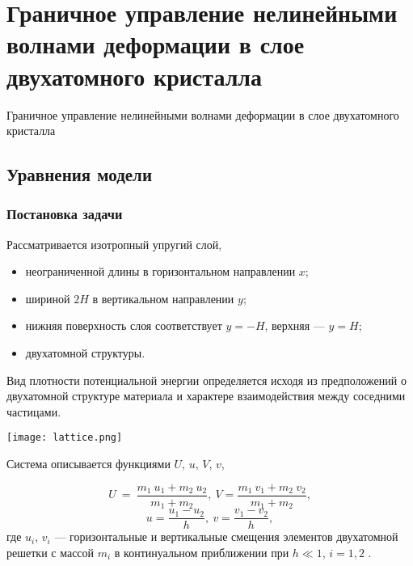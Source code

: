 \section{Граничное управление нелинейными волнами деформации в слое двухатомного кристалла}
\begin{frame}
    \begin{center}
        \Large
        Граничное управление нелинейными волнами деформации в слое двухатомного кристалла
    \end{center}
\end{frame}

\subsection{Уравнения модели}

\begin{frame}
	\frametitle{Постановка задачи}
Рассматривается изотропный упругий слой,
\begin{itemize}
	\item неограниченной длины в горизонтальном направлении $x$;
	\item шириной $2 H$ в вертикальном направлении $y$;
	\item нижняя поверхность слоя соответствует $y = -H$, верхняя --- $y = H$;
	\item двухатомной структуры.
\end{itemize}   

Вид плотности потенциальной энергии определяется исходя из предположений о двухатомной структуре материала и характере взаимодействия между соседними частицами.

\end{frame}

\begin{frame}
	\begin{center}
		\texttt{[image: lattice.png]}
	\end{center}
	Система описывается функциями $U$, $u$, $V$, $v$,
	
	$$
	U~=~\frac{m_1~u_1+m_2~u_2}{m_1+m_2},~V=\frac{m_1~v_1+m_2~v_2}{m_1+m_2},
	$$
	$$
	u=\frac{u_1-u_2}{h},~v=\frac{v_1-v_2}{h},
	$$
	где $u_i$, $v_i$ --- горизонтальные и вертикальные смещения элементов двухатомной решетки с массой $m_i$ в континуальном приближении при $h \ll 1$, $i=1,2$ \footnotemark.

\end{frame}


